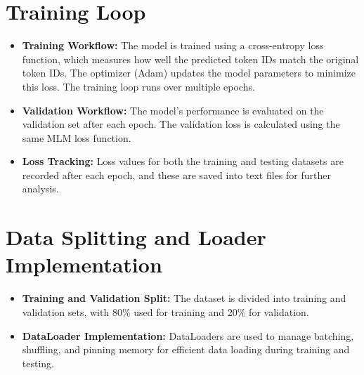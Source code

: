 \section{Training Loop}
\begin{itemize}
    \item \textbf{Training Workflow:} The model is trained using a cross-entropy loss function, which measures how well the predicted token IDs match the original token IDs. The optimizer (Adam) updates the model parameters to minimize this loss. The training loop runs over multiple epochs.
    \item \textbf{Validation Workflow:} The model's performance is evaluated on the validation set after each epoch. The validation loss is calculated using the same MLM loss function.
    \item \textbf{Loss Tracking:} Loss values for both the training and testing datasets are recorded after each epoch, and these are saved into text files for further analysis.
\end{itemize}

\section{Data Splitting and Loader Implementation}
\begin{itemize}
    \item \textbf{Training and Validation Split:} The dataset is divided into training and validation sets, with 80\% used for training and 20\% for validation.
    \item \textbf{DataLoader Implementation:} DataLoaders are used to manage batching, shuffling, and pinning memory for efficient data loading during training and testing.
\end{itemize}

\newpage

